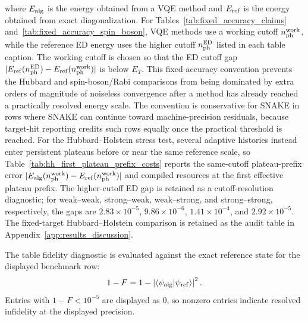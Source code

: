 \documentclass[
  reprint,
  amsmath,
  amssymb,
  aps,
  pra,
  nofootinbib,
  superscriptaddress,
  floatfix
]{revtex4-2}
\newcommand{\braket}[2]{\langle #1|#2\rangle}
\begin{document}
where $E_{\rm alg}$ is the energy obtained from a VQE method and $E_{\rm ref}$ is the energy obtained from exact diagonalization. For Tables~\ref{tab:fixed_accuracy_claims} and~\ref{tab:fixed_accuracy_spin_boson}, VQE methods use a working cutoff \(n_{\rm ph}^{\rm work}\), while the reference ED energy uses the higher cutoff \(n_{\rm ph}^{\rm ED}\) listed in each table caption. The working cutoff is chosen so that the ED cutoff gap \(|E_{\rm ref}(n_{\rm ph}^{\rm ED})-E_{\rm ref}(n_{\rm ph}^{\rm work})|\) is below \(E_T\). This fixed-accuracy convention prevents the Hubbard and spin-boson/Rabi comparisons from being dominated by extra orders of magnitude of noiseless convergence after a method has already reached a practically resolved energy scale. The convention is conservative for SNAKE in rows where SNAKE can continue toward machine-precision residuals, because target-hit reporting credits such rows equally once the practical threshold is reached. For the Hubbard--Holstein stress test, several adaptive histories instead enter persistent plateaus before or near the same reference scale, so Table~\ref{tab:hh_first_plateau_prefix_costs} reports the same-cutoff plateau-prefix error \(|E_{\rm alg}(n_{\rm ph}^{\rm work})-E_{\rm ref}(n_{\rm ph}^{\rm work})|\) and compiled resources at the first effective plateau prefix. The higher-cutoff ED gap is retained as a cutoff-resolution diagnostic; for weak--weak, strong--weak, weak--strong, and strong--strong, respectively, the gaps are \(2.83\times10^{-5}\), \(9.86\times10^{-6}\), \(1.41\times10^{-4}\), and \(2.92\times10^{-5}\). The fixed-target Hubbard--Holstein comparison is retained as the audit table in Appendix~\ref{app:results_discussion}.

The table fidelity diagnostic is evaluated against the exact reference state for the displayed benchmark row:
\begin{equation}
1-F=1-\left|\braket{\psi_{\rm alg}}{\psi_{\rm ref}}\right|^2 .
\label{eq:fidelity_diagnostic}
\end{equation}
Entries with \(1-F<10^{-5}\) are displayed as \(0\), so nonzero entries indicate resolved infidelity at the displayed precision.
\end{document}
